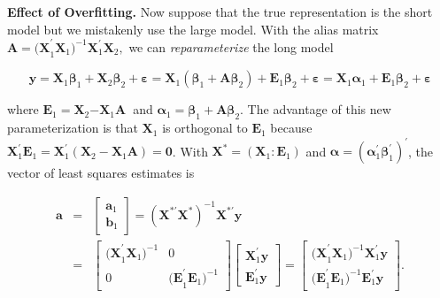 \textbf{Effect of Overfitting.} Now suppose that the true
representation is the short model but we mistakenly use the large
model. With the alias matrix
$\mathbf{A}=\mathbf{(X}_{1}^{\prime }\mathbf{X}_{1}%
\mathbf{)}^{-1}\mathbf{X}_{1}^{\prime }\mathbf{X}_{2},$ we can \textit{%
reparameterize} the long model
\begin{center}
\[
\mathbf{y}=\mathbf{X}_{1}\boldsymbol
\beta_{1}+\mathbf{X}_{2}\boldsymbol \beta_{2} + \boldsymbol
\varepsilon
=\mathbf{X}_{1}\left( \boldsymbol \beta_{1}+\mathbf{A \boldsymbol \beta }%
_{2}\right) +\mathbf{E}_{1}\boldsymbol \beta_{2} + \boldsymbol
\varepsilon = \mathbf{X}_{1}%
\boldsymbol \alpha_{1}+\mathbf{E}_{1}\boldsymbol \beta_{2} +
\boldsymbol \varepsilon
\]
\end{center}
where
$\mathbf{E}_{1}=\mathbf{X}_{2}\mathbf{-X}_{1}\mathbf{A}$\textbf{\
}and $\boldsymbol \alpha_{1}=\boldsymbol \beta_{1}+\mathbf{A
\boldsymbol \beta}_{2}$. The advantage of this new parameterization
is that $\mathbf{X}_{1}$ is
orthogonal to $\mathbf{E}_{1}$ because $\mathbf{X}_{1}^{\prime }\mathbf{E}%
_{1}=\mathbf{X}_{1}^{\prime }(\mathbf{X}_{2}-\mathbf{X}_{1}\mathbf{A})=%
\mathbf{0}$. With $\mathbf{X}^{\ast }=(\mathbf{X}%
_{1}: \mathbf{E}_{1})$ and $\boldsymbol \alpha =(\boldsymbol \alpha_{1}^{\prime }%
\boldsymbol \beta_{1}^{\prime })^{\prime }$, the vector of least
squares estimates is
\begin{center}
\begin{eqnarray*}
\mathbf{a} &=&%
\begin{bmatrix}
\mathbf{a}_{1} \\
\mathbf{b}_{1}%
\end{bmatrix}%
=\left( \mathbf{X}^{\ast \prime }\mathbf{X}^{\ast }\right) ^{-1}\mathbf{X}%
^{\ast \prime }\mathbf{y} \\
&=&%
\begin{bmatrix}
\mathbf{(X}_{1}^{\prime }\mathbf{X}_{1}\mathbf{)}^{-1} & 0 \\
0 & \mathbf{(E}_{1}^{\prime }\mathbf{E}_{1}\mathbf{)}^{-1}%
\end{bmatrix}%
\begin{bmatrix}
\mathbf{X}_{1}^{\prime }\mathbf{y} \\
\mathbf{E}_{1}^{\prime }\mathbf{y}%
\end{bmatrix}%
=%
\begin{bmatrix}
\mathbf{(X}_{1}^{\prime
}\mathbf{X}_{1}\mathbf{)}^{-1}\mathbf{X}_{1}^{\prime
}\mathbf{y} \\
\mathbf{(E}_{1}^{\prime
}\mathbf{E}_{1}\mathbf{)}^{-1}\mathbf{E}_{1}^{\prime
}\mathbf{y}%
\end{bmatrix}%
.
\end{eqnarray*}
\end{center}


